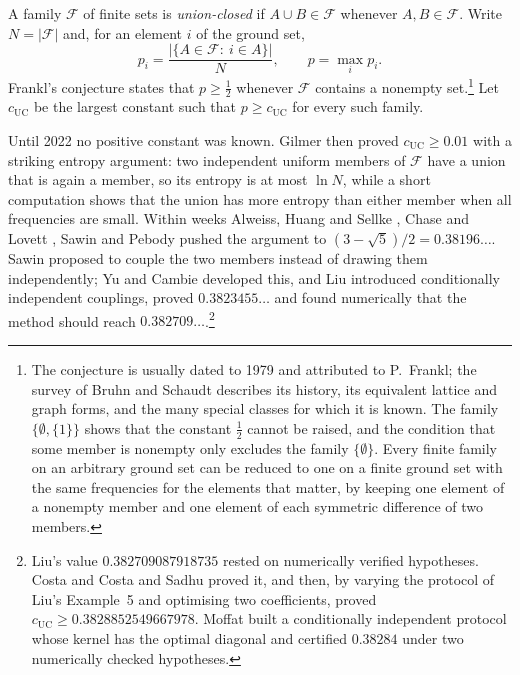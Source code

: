 \documentclass[aps,prd,twocolumn,superscriptaddress,nofootinbib,longbibliography,floatfix,amsmath,amssymb,10pt]{revtex4-2}
\theoremstyle{plain}
\theoremstyle{definition}
\theoremstyle{plain}
\newcommand{\cF}{\mathcal{F}}
\begin{document}
A family $\cF$ of finite sets is \emph{union-closed} if $A\cup B\in\cF$ whenever $A,B\in\cF$. Write $N=|\cF|$ and, for an element $i$ of the ground set,
\[
p_i=\frac{|\{A\in\cF:\ i\in A\}|}{N},\qquad p=\max_i p_i .
\]
Frankl's conjecture states that $p\ge \tfrac12$ whenever $\cF$ contains a nonempty set.\footnote{The conjecture is usually dated to 1979 and attributed to P.~Frankl; the survey of Bruhn and Schaudt \cite{BS15} describes its history, its equivalent lattice and graph forms, and the many special classes for which it is known. The family $\{\emptyset,\{1\}\}$ shows that the constant $\tfrac12$ cannot be raised, and the condition that some member is nonempty only excludes the family $\{\emptyset\}$. Every finite family on an arbitrary ground set can be reduced to one on a finite ground set with the same frequencies for the elements that matter, by keeping one element of a nonempty member and one element of each symmetric difference of two members.} Let $c_{\mathrm{UC}}$ be the largest constant such that $p\ge c_{\mathrm{UC}}$ for every such family.

Until 2022 no positive constant was known. Gilmer \cite{Gil22} then proved $c_{\mathrm{UC}}\ge 0.01$ with a striking entropy argument: two independent uniform members of $\cF$ have a union that is again a member, so its entropy is at most $\ln N$, while a short computation shows that the union has more entropy than either member when all frequencies are small. Within weeks Alweiss, Huang and Sellke \cite{AHS24}, Chase and Lovett \cite{CL22}, Sawin \cite{Saw22} and Pebody \cite{Peb22} pushed the argument to $(3-\sqrt5)/2=0.38196\ldots$. Sawin proposed to couple the two members instead of drawing them independently; Yu \cite{Yu23} and Cambie \cite{Cam22} developed this, and Liu \cite{Liu23} introduced conditionally independent couplings, proved $0.3823455\ldots$ and found numerically that the method should reach $0.382709\ldots$.\footnote{Liu's value $0.382709087918735$ rested on numerically verified hypotheses. Costa \cite{Cos26} and Costa and Sadhu \cite{CS26} proved it, and then, by varying the protocol of Liu's Example~5 and optimising two coefficients, proved $c_{\mathrm{UC}}\ge 0.3828852549667978$. Moffat \cite{Mof26} built a conditionally independent protocol whose kernel has the optimal diagonal and certified $0.38284$ under two numerically checked hypotheses.}
\end{document}
